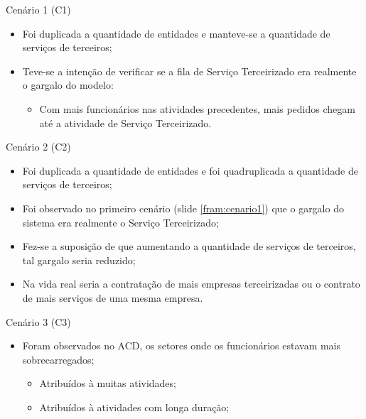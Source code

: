 \documentclass[xcolor=dvipsnames]{beamer}
\let\olditem=\item%
\renewcommand{\item}{\olditem \justifying}%
\begin{document}
\begin{frame}{Cenário 1 (C1)}
	\label{fram:cenario1}
	\begin{itemize}
		\item  Foi duplicada a quantidade de entidades e manteve-se a quantidade de serviços de terceiros;
		      \bigskip
		\item Teve-se a intenção de verificar se a fila de Serviço Terceirizado era realmente o gargalo do modelo:
        \medskip
		      \begin{itemize}
		      	\item Com mais funcionários nas atividades precedentes, mais pedidos chegam até a atividade de Serviço Terceirizado.
		      \end{itemize}
	\end{itemize}
\end{frame}	
		
\begin{frame}{Cenário 2 (C2)}
	\label{fram:cenario2}
	\begin{itemize}
		\item Foi duplicada a quantidade de entidades e foi quadruplicada a quantidade de serviços de terceiros;
		      \bigskip
		\item Foi observado no primeiro cenário (slide \ref{fram:cenario1}) que o gargalo do sistema era realmente o Serviço Terceirizado;
		      \bigskip
		\item Fez-se a suposição de que aumentando a quantidade de serviços de terceiros, tal gargalo seria reduzido;
		      \bigskip
		\item Na vida real seria a contratação de mais empresas terceirizadas ou o contrato de mais serviços de uma mesma empresa.
	\end{itemize}
\end{frame}	
		
\begin{frame}{Cenário 3 (C3)}
	\label{fram:cenario3}
	\begin{itemize}
		\item Foram observados no ACD, os setores onde os funcionários estavam mais sobrecarregados;
		      				
		      \bigskip
		      				
		      \begin{itemize}
		      	\item Atribuídos à muitas atividades;
		      	      					
		      	      \bigskip
		      	      					
		      	\item Atribuídos à atividades com longa duração;
		      \end{itemize}
	\end{itemize}
\end{frame}	
		
\end{document}
